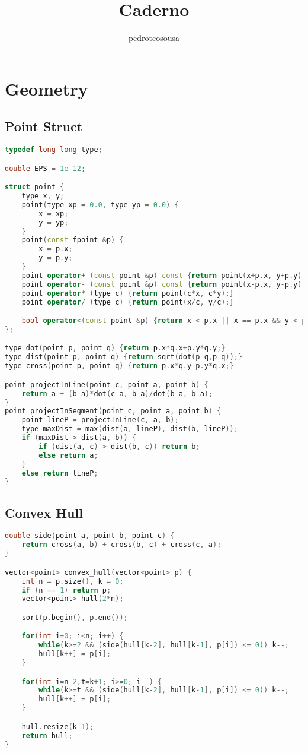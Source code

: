\documentclass{article}
\title{Caderno}
\author{pedroteosousa }
\date{}
\begin{document}
\maketitle
\tableofcontents

\section{Geometry}
\subsection{Point Struct}
\begin{lstlisting}[language=C++]
typedef long long type;

double EPS = 1e-12;

struct point {
    type x, y;
    point(type xp = 0.0, type yp = 0.0) {
        x = xp;
        y = yp;
    }
    point(const fpoint &p) {
        x = p.x;
        y = p.y;
    }
    point operator+ (const point &p) const {return point(x+p.x, y+p.y);}
    point operator- (const point &p) const {return point(x-p.x, y-p.y);}
    point operator* (type c) {return point(c*x, c*y);}
    point operator/ (type c) {return point(x/c, y/c);}

    bool operator<(const point &p) {return x < p.x || x == p.x && y < p.y;}
};

type dot(point p, point q) {return p.x*q.x+p.y*q.y;}
type dist(point p, point q) {return sqrt(dot(p-q,p-q));}
type cross(point p, point q) {return p.x*q.y-p.y*q.x;}

point projectInLine(point c, point a, point b) {
	return a + (b-a)*dot(c-a, b-a)/dot(b-a, b-a);
}
point projectInSegment(point c, point a, point b) {
    point lineP = projectInLine(c, a, b);
    type maxDist = max(dist(a, lineP), dist(b, lineP));
    if (maxDist > dist(a, b)) {
        if (dist(a, c) > dist(b, c)) return b;
        else return a;
    }
    else return lineP;
}\end{lstlisting}
\subsection{Convex Hull}
\begin{lstlisting}[language=C++]
double side(point a, point b, point c) {
    return cross(a, b) + cross(b, c) + cross(c, a);
}

vector<point> convex_hull(vector<point> p) {
    int n = p.size(), k = 0;
    if (n == 1) return p;
    vector<point> hull(2*n);

    sort(p.begin(), p.end());

    for(int i=0; i<n; i++) {
        while(k>=2 && (side(hull[k-2], hull[k-1], p[i]) <= 0)) k--;
        hull[k++] = p[i];
    }

    for(int i=n-2,t=k+1; i>=0; i--) {
        while(k>=t && (side(hull[k-2], hull[k-1], p[i]) <= 0)) k--;
        hull[k++] = p[i];
    }

    hull.resize(k-1);
    return hull;
}\end{lstlisting}
\end{document}
